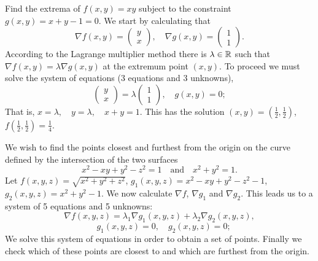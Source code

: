 \begin{example*}
    Find the extrema of \(f(x,y) = xy\) subject to the constraint \(g(x,y) = x+y-1 =0\).
    We start by calculating that
    \[
        \nabla f(x,y) = \left(\begin{smallmatrix}
                y\\ x
            \end{smallmatrix}\right),
        \quad
        \nabla g(x,y) = \left(\begin{smallmatrix}
                1\\ 1
            \end{smallmatrix}\right).
    \]
    According to the Lagrange multiplier method there is \(\lambda\in \mathbb{R}\) such that \(\nabla f(x,y) = \lambda \nabla g(x,y)\) at the extremum point \((x,y)\).
    To proceed we must solve the system of equations (3 equations and 3 unknowns),
    \[
        \left(\begin{smallmatrix}
                y\\ x
            \end{smallmatrix}\right)
        = \lambda \left(\begin{smallmatrix}
                1\\ 1
            \end{smallmatrix}\right),
        \quad g(x,y) =0;
    \]
    That is,
    \( x = \lambda, \quad
    y = \lambda, \quad
    x+y = 1
    \).
    This has the solution \((x,y) = (\frac{1}{2},\frac{1}{2})\), \(f(\frac{1}{2},\frac{1}{2})= \frac{1}{4}\).
\end{example*}


\begin{example*}
    We wish to find the points closest and furthest from the origin on the curve defined by the intersection of the two surfaces
    \[
        x^2 - xy + y^2 - z^2 = 1
        \quad \text{and} \quad
        x^2 + y^2 = 1.
    \]
    Let \(f(x,y,z) = \sqrt{x^2 + y^2 + z^2}\),
    \(g_1(x,y,z) = x^2 - xy + y^2 - z^2 - 1\),
    \(g_2(x,y,z) = x^2 + y^2 - 1\).
    We now calculate \(\nabla f\), \(\nabla g_1\) and \(\nabla g_2\).
    This leads us to a system of 5 equations and 5 unknowns:
    \[
        \nabla f (x,y,z) = \lambda_1 \nabla g_1(x,y,z)  + \lambda_2 \nabla g_2(x,y,z),
    \]
    \[
        \quad g_1(x,y,z) =0,
        \quad g_2(x,y,z) =0;
    \]
    We solve this system of equations in order to obtain a set of points. Finally we check which of these points are closest to and which are furthest from the origin.
\end{example*}



